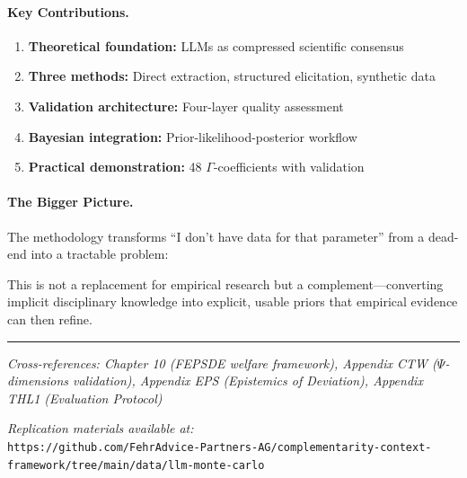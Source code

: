 \paragraph{Key Contributions.}
\begin{enumerate}
    \item \textbf{Theoretical foundation:} LLMs as compressed scientific consensus
    \item \textbf{Three methods:} Direct extraction, structured elicitation, synthetic data
    \item \textbf{Validation architecture:} Four-layer quality assessment
    \item \textbf{Bayesian integration:} Prior-likelihood-posterior workflow
    \item \textbf{Practical demonstration:} 48 $\Gamma$-coefficients with validation
\end{enumerate}

\paragraph{The Bigger Picture.}
The methodology transforms ``I don't have data for that parameter'' from a dead-end into a tractable problem:

\begin{center}
\end{center}

This is not a replacement for empirical research but a complement---converting implicit disciplinary knowledge into explicit, usable priors that empirical evidence can then refine.

\vspace{1em}
\hrule
\vspace{0.5em}
\noindent\textit{Cross-references: Chapter 10 (FEPSDE welfare framework), Appendix CTW ($\Psi$-dimensions validation), Appendix EPS (Epistemics of Deviation), Appendix THL1 (Evaluation Protocol)}

\vspace{1em}
\noindent\textit{Replication materials available at:}\\
\texttt{https://github.com/FehrAdvice-Partners-AG/complementarity-context-framework/tree/main/data/llm-monte-carlo}

